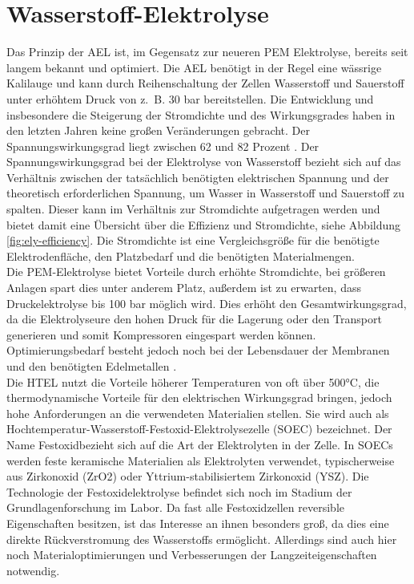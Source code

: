 \section{Wasserstoff-Elektrolyse}
\label{sec:Elektrolyse}
Das Prinzip der \gls{AEL} ist, im Gegensatz zur neueren \gls{PEM} Elektrolyse, bereits seit langem bekannt und optimiert. Die \gls{AEL} benötigt in der Regel eine wässrige Kalilauge und kann durch Reihenschaltung der Zellen Wasserstoff und Sauerstoff unter erhöhtem Druck von z.~B. 30 bar bereitstellen. Die Entwicklung und insbesondere die Steigerung der Stromdichte und des Wirkungsgrades haben in den letzten Jahren keine großen Veränderungen gebracht. Der Spannungswirkungsgrad liegt zwischen 62 und 82 Prozent \cite{NOWH2}. Der Spannungswirkungsgrad bei der Elektrolyse von Wasserstoff bezieht sich auf das Verhältnis zwischen der tatsächlich benötigten elektrischen Spannung und der theoretisch erforderlichen Spannung, um Wasser in Wasserstoff und Sauerstoff zu spalten. Dieser kann im Verhältnis zur Stromdichte aufgetragen werden und bietet damit eine Übersicht über die Effizienz und Stromdichte, siehe Abbildung \ref{fig:ely-efficiency}. Die Stromdichte ist eine Vergleichsgröße für die benötigte Elektrodenfläche, den Platzbedarf und die benötigten Materialmengen.\\
Die \gls{PEM}-Elektrolyse bietet Vorteile durch erhöhte Stromdichte, bei größeren Anlagen spart dies unter anderem Platz, außerdem ist zu erwarten, dass Druckelektrolyse bis 100 bar möglich wird. Dies erhöht den Gesamtwirkungsgrad, da die Elektrolyseure den hohen Druck für die Lagerung oder den Transport generieren und somit Kompressoren eingespart werden können. Optimierungsbedarf besteht jedoch noch bei der Lebensdauer der Membranen und den benötigten Edelmetallen \cite{NOWH2}. \\
Die \gls{HTEL} nutzt die Vorteile höherer Temperaturen von oft über 500°C, die thermodynamische Vorteile für den elektrischen Wirkungsgrad bringen, jedoch hohe Anforderungen an die verwendeten Materialien stellen. Sie wird auch als Hochtemperatur-Wasserstoff-Festoxid-Elektrolysezelle (SOEC) bezeichnet. Der Name \glqq Festoxid\grqq bezieht sich auf die Art der Elektrolyten in der Zelle. In SOECs werden feste keramische Materialien als Elektrolyten verwendet, typischerweise aus Zirkonoxid (ZrO2) oder Yttrium-stabilisiertem Zirkonoxid (YSZ). Die Technologie der Festoxidelektrolyse befindet sich noch im Stadium der Grundlagenforschung im Labor. Da fast alle Festoxidzellen reversible Eigenschaften besitzen, ist das Interesse an ihnen besonders groß, da dies eine direkte Rückverstromung des Wasserstoffs ermöglicht. Allerdings sind auch hier noch Materialoptimierungen und Verbesserungen der Langzeiteigenschaften notwendig.\\
